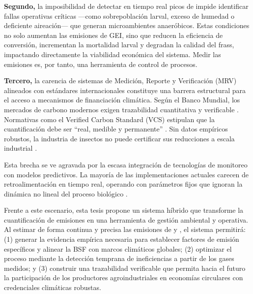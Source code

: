 \textbf{Segundo,} la imposibilidad de detectar en tiempo real picos de  impide identificar fallas operativas críticas ---como sobrepoblación larval, exceso de humedad o deficiente aireación--- que generan microambientes anaeróbicos. Estas condiciones no solo aumentan las emisiones de GEI, sino que reducen la eficiencia de conversión, incrementan la mortalidad larval y degradan la calidad del frass, impactando directamente la viabilidad económica del sistema. Medir las emisiones es, por tanto, una herramienta de control de procesos.

\textbf{Tercero,} la carencia de sistemas de Medición, Reporte y Verificación (MRV) alineados con estándares internacionales constituye una barrera estructural para el acceso a mecanismos de financiación climática. Según el Banco Mundial, los mercados de carbono modernos exigen trazabilidad cuantitativa y verificable \cite{worldbankStateTrendsCarbon2023}. Normativas como el Verified Carbon Standard (VCS) estipulan que la cuantificación debe ser ``real, medible y permanente'' \cite{VCSStandardv47FINAL41524}. Sin datos empíricos robustos, la industria de insectos no puede certificar sus reducciones a escala industrial \cite{smetanaSustainableUseHermetia2019a}.

Esta brecha se ve agravada por la escasa integración de tecnologías de monitoreo con modelos predictivos. La mayoría de las implementaciones actuales carecen de retroalimentación en tiempo real, operando con parámetros fijos que ignoran la dinámica no lineal del proceso biológico \cite{kamilarisReviewPracticeBig2017, liuOptimizingDataPipelines2023a}.

Frente a este escenario, esta tesis propone un sistema híbrido que transforme la cuantificación de emisiones en una herramienta de gestión ambiental y operativa. Al estimar de forma continua y precisa las emisiones de  y , el sistema permitirá: (1) generar la evidencia empírica necesaria para establecer factores de emisión específicos y alinear la BSF con marcos climáticos globales; (2) optimizar el proceso mediante la detección temprana de ineficiencias a partir de los gases medidos; y (3) construir una trazabilidad verificable que permita hacia el futuro la participación de los productores agroindustriales en economías circulares con credenciales climáticas robustas.
